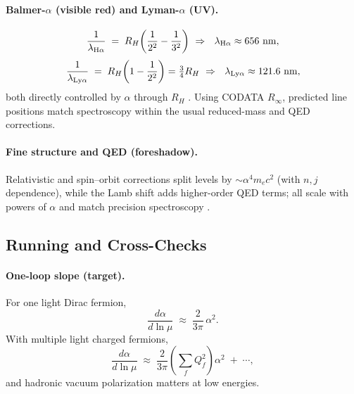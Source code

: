 \paragraph{Balmer-\(\alpha\) (visible red) and Lyman-\(\alpha\) (UV).}
\begin{equation}
\frac{1}{\lambda_{\rm H\alpha}} \;=\; R_H\!\left(\frac{1}{2^2}-\frac{1}{3^2}\right)
\ \Rightarrow\ \ \lambda_{\rm H\alpha}\approx 656~\mathrm{nm},
\end{equation}
\begin{equation}
\frac{1}{\lambda_{\rm Ly\alpha}} \;=\; R_H\!\left(1-\frac{1}{2^2}\right)=\tfrac{3}{4}R_H
\ \Rightarrow\ \ \lambda_{\rm Ly\alpha}\approx 121.6~\mathrm{nm},
\end{equation}
both directly controlled by \(\alpha\) through \(R_H\) \cite{rydberg1890,fowler1922hydrogen}.
Using CODATA \(R_\infty\), predicted line positions match spectroscopy within the usual reduced-mass and QED corrections.

\paragraph{Fine structure and QED (foreshadow).}
Relativistic and spin--orbit corrections split levels by \(\sim \alpha^4 m_e c^2\) (with \(n,j\) dependence),
while the Lamb shift adds higher-order QED terms; all scale with powers of \(\alpha\) and match precision spectroscopy
\cite{dirac1930principles,bethe1947lamb,griffiths2018quantum}.

\subsection*{Running and Cross-Checks}

\paragraph{One-loop slope (target).}
For one light Dirac fermion,
\begin{equation}
\frac{d\alpha}{d\ln\mu} \;\approx\; \frac{2}{3\pi}\,\alpha^2.
\end{equation}
With multiple light charged fermions,
\begin{equation}
\frac{d\alpha}{d\ln\mu} \;\approx\; \frac{2}{3\pi}\!\left(\sum_f Q_f^2\right)\alpha^2 \;+\; \cdots,
\end{equation}
and hadronic vacuum polarization matters at low energies.

